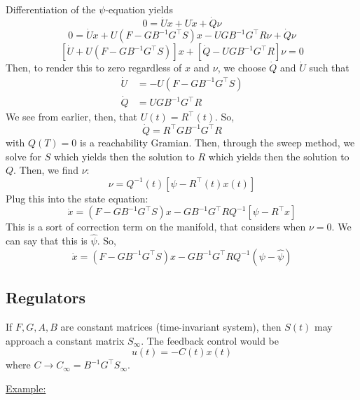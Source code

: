 \documentclass{article}
\begin{document}
Differentiation of the $\psi$-equation yields
\[0 = \dot{U}x + U\dot{x} + \dot{Q}\nu\]
\[0 = \dot{U}x + U(F-GB^{-1}G^\top S)x - UGB^{-1}G^\top R\nu + \dot{Q}\nu\]
\[[\dot{U}+U(F-GB^{-1}G^\top S)]x + [\dot{Q}-UGB^{-1}G^\top R]\nu = 0\]
Then, to render this to zero regardless of $x$ and $\nu$,
we choose $\dot{Q}$ and $\dot{U}$ such that
\begin{align*}
    \dot{U} &= -U(F-GB^{-1}G^\top S) \\
    \dot{Q} &= UGB^{-1}G^\top R
\end{align*}
We see from earlier, then, that $U(t) = R^\top(t)$. So,
\[\dot{Q} = R^\top GB^{-1}G^\top R\]
with $Q(T) = 0$ is a reachability Gramian. Then, through the sweep method, we solve
for $S$ which yields then the solution to $R$ which yields then the solution to $Q$.
Then, we find $\nu$:
\[\nu = Q^{-1}(t)[\psi-R^\top(t)x(t)]\]
Plug this into the state equation:
\[\dot{x} = (F-GB^{-1}G^\top S)x - GB^{-1}G^\top RQ^{-1}[\psi-R^\top x]\]
This is a sort of correction term on the manifold, that considers when
$\nu = 0$. We can say that this is $\hat{\psi}$. So,
\[\dot{x} = (F-GB^{-1}G^\top S)x - GB^{-1}G^\top RQ^{-1}(\psi-\hat{\psi})\]

\subsection{Regulators}

\noindent
If $F,G,A,B$ are constant matrices (time-invariant system), then $S(t)$ may approach
a constant matrix $S_\infty$. The feedback control would be
\[u(t) = -C(t)x(t)\]
where $C \rightarrow C_\infty = B^{-1}G^\top S_\infty$.

\noindent
\underline{Example:}
\end{document}
